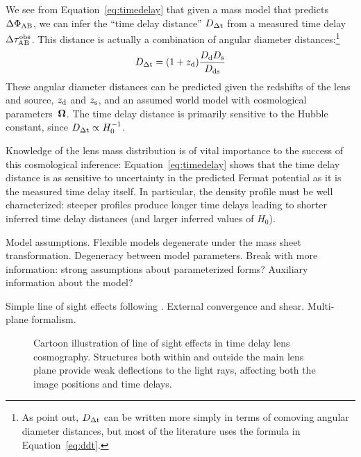 
We see from Equation~\ref{eq:timedelay} that given a mass
model that predicts $\Delta \Phi_{\rm AB}$, we can infer the ``time
delay distance'' $D_{\Delta{\rm t}}$ from a measured time delay $\Delta \tau_{\rm AB}^{\rm obs}$.
This distance is actually a combination of angular diameter
distances:\footnote{As \citet{SKW06} point out, $D_{\Delta{\rm t}}$ can be written more simply in terms
of comoving angular diameter distances, but most of the literature uses the
formula in Equation~\ref{eq:ddt}.}
\begin{equation}
    D_{\Delta{\rm t}} = (1+z_{\rm d}) \frac{D_{\rm d} D_{\rm s}}{D_{\rm ds}}  \label{eq:ddt}
\end{equation}
These angular diameter distances can be predicted given the redshifts
of the lens and source, $z_{\rm d}$ and $z_{\rm s}$, and an assumed world model with
cosmological parameters~$\boldsymbol{\Omega}$. The time delay distance is primarily
sensitive to the Hubble constant, since $D_{\Delta{\rm t}} \propto H_0^{-1}$.


Knowledge of the lens mass distribution is of vital importance to the
success of this cosmological inference: Equation~\ref{eq:timedelay}
shows  that the time delay  distance is as sensitive to uncertainty in
the predicted Fermat  potential as it is the measured time delay itself.
In particular, the  density profile must be well characterized: steeper
profiles produce  longer time delays leading to shorter inferred time
delay distances (and larger inferred values of $H_0$).





Model assumptions. Flexible models degenerate under the mass sheet transformation.
Degeneracy between model parameters. Break with more information: strong assumptions about parameterized forms?
Auxiliary information about the model?


Simple line of sight effects following \citep{SKW06}. External convergence and shear.
Multi-plane formalism.

\begin{figure}
\caption{Cartoon illustration of line of sight effects in time delay
lens cosmography. Structures both within and outside the main lens
plane provide weak deflections to the light rays, affecting both the
image positions and time delays.} \label{fig:lineofsightcartoon}
\end{figure}
